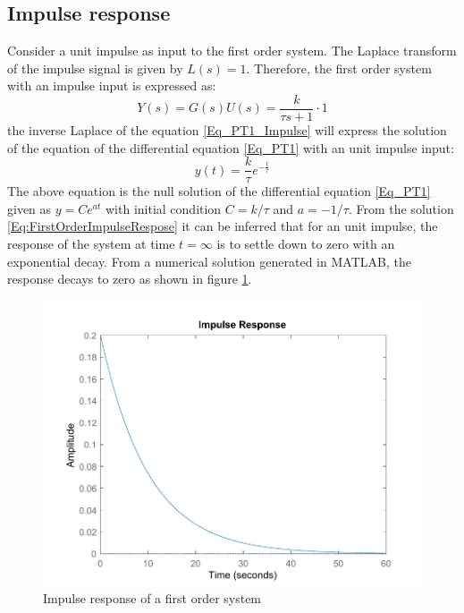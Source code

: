 \subsection{Impulse response}

Consider a unit impulse as input to the first order system. The Laplace transform of the impulse signal is given by $L(s) = 1$. Therefore, the first order system with an impulse input is expressed as:
\begin{equation} \label{Eq_PT1_Impulse}
Y(s) = G(s)U(s) = \frac{k}{\tau s + 1} \cdot 1
\end{equation}
the inverse Laplace of the equation \eqref{Eq_PT1_Impulse} will express the solution of the equation of the differential equation \eqref{Eq_PT1} with an unit impulse input:
\begin{equation} \label{Eq:FirstOrderImpulseRespose}
y(t) = \frac{k}{\tau}e^{-\frac{t}{\tau}}
\end{equation}
The above equation is the null solution of the differential equation \eqref{Eq_PT1} given as $y = C e^{at}$ with initial condition $C = k/\tau$ and $a = -1/\tau$. From the solution \eqref{Eq:FirstOrderImpulseRespose} it can be inferred that for an unit impulse, the response of the system at time $t = \infty$ is to settle down to zero with an exponential decay. From a numerical solution generated in MATLAB, the response decays to zero as shown in figure \ref{fig:ImpulseReponseFirstOrderSystem}.
\begin{figure}[h!]
	\centering
	\includegraphics[scale=0.6]{Bilder/ImpulseReponseFirstOrderSystem.pdf}
	\caption{Impulse response of a first order system}
	\label{fig:ImpulseReponseFirstOrderSystem}
\end{figure}

